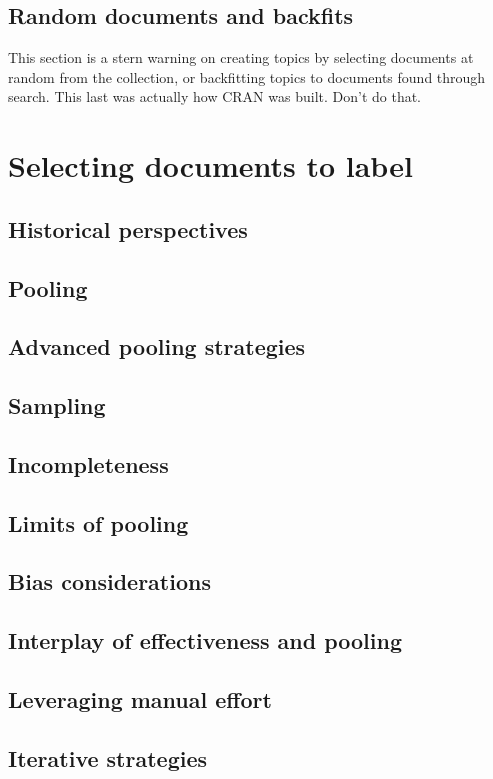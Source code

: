 \documentclass[nobib]{tufte-book}
\begin{document}
\section{Random documents and backfits}

This section is a stern warning on creating topics by selecting documents at random from the collection, or backfitting topics to documents found through search.  This last was actually how CRAN was built.  Don't do that.

\chapter{Selecting documents to label}

\section{Historical perspectives}
\section{Pooling}
\section{Advanced pooling strategies}
\section{Sampling}
\section{Incompleteness}
\section{Limits of pooling}
\section{Bias considerations}
\section{Interplay of effectiveness and pooling}
\section{Leveraging manual effort}
\section{Iterative strategies}
\end{document}
